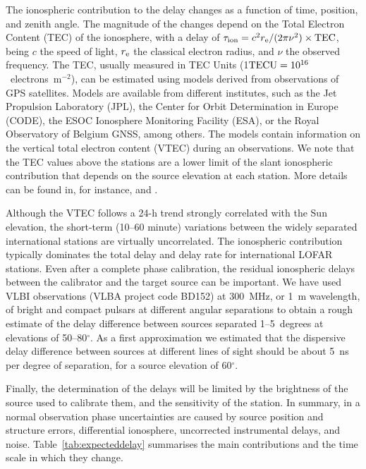 \documentclass[graybox]{svmult}
\begin{document}
The ionospheric contribution to the delay changes as a function of time,
position, and zenith angle.  The magnitude of the changes depend on the Total
Electron Content (TEC) of the ionosphere, with a delay of $\tau_{\rm
ion}=c^{2}r_{\rm e}/(2\pi\nu^{2})\times {\rm TEC}$, being $c$ the speed of
light, $r_{\rm e}$ the classical electron radius, and $\nu$ the observed
frequency. The TEC, usually measured in TEC Units (1${\rm
TECU}=10^{16}$~electrons~m$^{-2}$), can be estimated using models derived from
observations of GPS satellites.  Models are available from different
institutes, such as the Jet Propulsion Laboratory (JPL), the Center for Orbit
Determination in Europe (CODE), the ESOC Ionosphere Monitoring Facility (ESA),
or the Royal Observatory of Belgium GNSS, among others. The models contain
information on the vertical total electron content (VTEC) during an
observations. We note that the TEC values above the stations are a lower limit
of the slant ionospheric contribution that depends on the source elevation at
each station. More details can be found in, for instance, \cite{nigl07} and
\cite{sotomayor13a}.

Although the VTEC follows a 24-h trend strongly correlated with the Sun
elevation, the short-term (10--60 minute) variations between the widely
separated international stations are virtually uncorrelated.  The ionospheric
contribution typically dominates the total delay and delay rate for
international LOFAR stations. Even after a complete phase calibration, the
residual ionospheric delays between the calibrator and the target source can be
important. We have used VLBI observations (VLBA project code BD152) at 300~MHz,
or 1~m wavelength, of bright and compact pulsars at different angular
separations to obtain a rough estimate of the delay difference between sources
separated 1--5~degrees at elevations of 50--80$^{\circ}$. As a first
approximation we estimated that the dispersive delay difference between sources
at different lines of sight should be about 5~ns per degree of separation, for
a source elevation of 60$^{\circ}$.

Finally, the determination of the delays will be limited by the brightness of
the source used to calibrate them, and the sensitivity of the station. In
summary, in a normal observation phase uncertainties are caused by source
position and structure errors, differential ionosphere, uncorrected
instrumental delays, and noise. Table~\ref{tab:expecteddelay} summarises the
main contributions and the time scale in which they change. 
\end{document}
